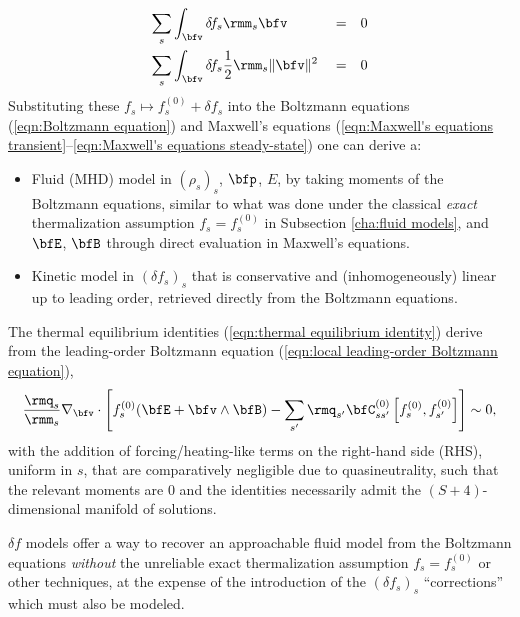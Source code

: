\begin{definition}
\begin{align}
                        \sum_{s}&\int_{\bfv}\delta\!f_{s}\rmm_{s}\bfv                     &  &=  &  0  \\
                        \sum_{s}&\int_{\bfv}\delta\!f_{s}\frac{1}{2}\rmm_{s}\|\bfv\|^{2}  &  &=  &  0  \label{eqn:correction energy moment}
        \end{align}
        Substituting these $f_{s}  \mapsto  f_{s}^{(0)} + \delta\!f_{s}$ into the Boltzmann equations (\ref{eqn:Boltzmann equation}) and Maxwell's equations (\ref{eqn:Maxwell's equations transient}--\ref{eqn:Maxwell's equations steady-state}) one can derive a:
        \begin{itemize}
            \item  Fluid (MHD) model in $(\rho_{s})_{s}$, $\bfp$, $E$, by taking moments of the Boltzmann equations, similar to what was done under the classical \emph{exact} thermalization assumption $f_{s}  =  f_{s}^{(0)}$ in Subsection \ref{cha:fluid models}, and $\bfE$, $\bfB$ through direct evaluation in Maxwell's equations.
            \item  Kinetic model in $(\delta\!f_{s})_{s}$ that is conservative and (inhomogeneously) linear up to leading order, retrieved directly from the Boltzmann equations.
        \end{itemize}
    \end{definition}

    The thermal equilibrium identities (\ref{eqn:thermal equilibrium identity}) derive from the leading-order Boltzmann equation (\ref{eqn:local leading-order Boltzmann equation}),
    \begin{equation}
        \frac{\rmq_{s}}{\rmm_{s}}\nabla_{\bfv}\cdot\left[f_{s}^{(0)}(\bfE + \bfv\wedge\bfB) - \sum_{s'}\rmq_{s'}\bfC_{ss'}^{(0)}\left[f_{s}^{(0)}, f_{s'}^{(0)}\right]\right]  \sim  0,
    \end{equation}
    with the addition of forcing/heating-like terms on the right-hand side (RHS), uniform in $s$, that are comparatively negligible due to quasineutrality, such that the relevant moments are 0 and the identities necessarily admit the $(S + 4)$-dimensional manifold of solutions.

    $\delta\!f$ models offer a way to recover an approachable fluid model from the Boltzmann equations \emph{without} the unreliable exact thermalization assumption $f_{s}  =  f_{s}^{(0)}$ or other techniques, at the expense of the introduction of the $(\delta\!f_{s})_{s}$ ``corrections'' which must also be modeled.

    \line

